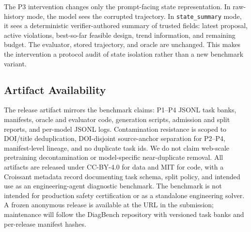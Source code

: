 The P3 intervention changes only the prompt-facing state representation. In raw-history mode, the model sees the corrupted trajectory. In \texttt{state\_summary} mode, it sees a deterministic verifier-authored summary of trusted fields: latest proposal, active violations, best-so-far feasible design, trend information, and remaining budget. The evaluator, stored trajectory, and oracle are unchanged. This makes the intervention a protocol audit of state isolation rather than a new benchmark variant.

\subsection{Artifact Availability}

The release artifact mirrors the benchmark claims: P1--P4 JSONL task banks, manifests, oracle and evaluator code, generation scripts, admission and split reports, and per-model JSONL logs. Contamination resistance is scoped to DOI/title deduplication, DOI-disjoint source-anchor separation for P2--P4, manifest-level lineage, and no duplicate task ids. We do not claim web-scale pretraining decontamination or model-specific near-duplicate removal. All artifacts are released under CC-BY-4.0 for data and MIT for code, with a Croissant metadata record documenting task schema, split policy, and intended use as an engineering-agent diagnostic benchmark. The benchmark is not intended for production safety certification or as a standalone engineering solver. A frozen anonymous release is available at the URL in the submission; maintenance will follow the DiagBench repository with versioned task banks and per-release manifest hashes.
